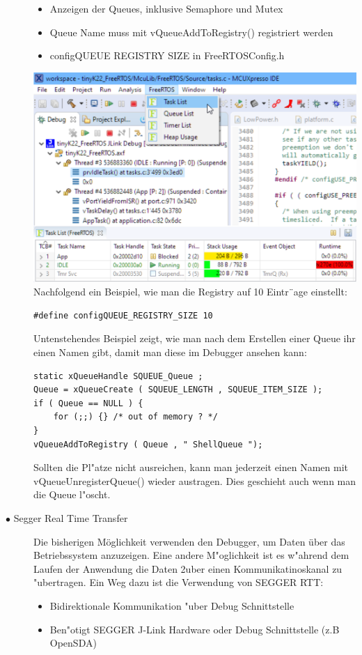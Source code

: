 \documentclass[a4paper, 8pt]{extarticle}
\begin{document}
\begin{multicols*}{3}
\begin{description}
							\begin{itemize}
								\item Anzeigen der Queues, inklusive Semaphore und Mutex
								\item Queue Name muss mit vQueueAddToRegistry() registriert werden
								\item configQUEUE REGISTRY SIZE in FreeRTOSConfig.h
							\end{itemize}
							\includegraphics[width=0.6\linewidth,left]{img/Queue_List_view.PNG}
							Nachfolgend ein Beispiel, wie man die Registry auf 10 Eintr¨age einstellt:
							\begin{lstlisting}
#define configQUEUE_REGISTRY_SIZE 10
							\end{lstlisting}
							Untenstehendes Beispiel zeigt, wie man nach dem Erstellen einer Queue ihr
							einen Namen gibt, damit man diese im Debugger ansehen kann:
							\begin{lstlisting}
static xQueueHandle SQUEUE_Queue ;
Queue = xQueueCreate ( SQUEUE_LENGTH , SQUEUE_ITEM_SIZE );
if ( Queue == NULL ) {
	for (;;) {} /* out of memory ? */
}
vQueueAddToRegistry ( Queue , " ShellQueue ");
							\end{lstlisting}
							Sollten die Pl"atze nicht ausreichen, kann man jederzeit einen Namen mit
							vQueueUnregisterQueue() wieder austragen. Dies geschieht auch wenn man
							die Queue l"oscht.
						\item[$\bullet$ Segger Real Time Transfer] 
						Die bisherigen Möglichkeit verwenden den Debugger, um Daten über das Betriebssystem anzuzeigen. 
						Eine andere M"oglichkeit ist es w"ahrend dem Laufen der Anwendung die Daten 2uber einen Kommunikatinoskanal zu "ubertragen.
						Ein Weg dazu ist die Verwendung von SEGGER RTT:
						\begin{itemize}
							\item Bidirektionale Kommunikation "uber Debug Schnittstelle
							\item Ben"otigt SEGGER J-Link Hardware oder Debug Schnittstelle (z.B OpenSDA)

\end{itemize}
\end{description}
\end{multicols*}
\end{document}
